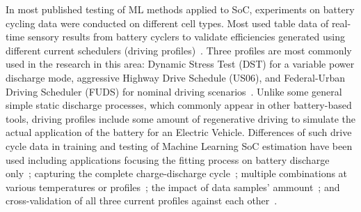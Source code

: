 %
In most published testing of ML methods applied to SoC, experiments on battery cycling data were conducted on different cell types.
Most used table data of real-time sensory results from battery cyclers to validate efficiencies generated using different current schedulers (driving profiles)~\cite{Chemali2017,song_lithium-ion_2018,mamo_long_2020,xiao_accurate_2019}.
Three profiles are most commonly used in the research in this area: Dynamic Stress Test (DST) for a variable power discharge mode, aggressive Highway Drive Schedule (US06), and Federal-Urban Driving Scheduler (FUDS) for nominal driving scenarios~\cite{xiao_accurate_2019,javid_adaptive_2020,mamo_long_2020}.
Unlike some general simple static discharge processes, which commonly appear in other battery-based tools, driving profiles include some amount of regenerative driving to simulate the actual application of the battery for an Electric Vehicle.
Differences of such drive cycle data in training and testing of Machine Learning SoC estimation have been used including applications focusing the fitting process on battery discharge only~\cite{song_lithium-ion_2018,mamo_long_2020,jiao_gru-rnn_2020,javid_adaptive_2020}; capturing the complete charge-discharge cycle~\cite{Chemali2017}; multiple combinations at various temperatures or profiles~\cite{xiao_accurate_2019,mamo_long_2020,Chemali2017,javid_adaptive_2020}; the impact of data samples' ammount~\cite{song_lithium-ion_2018}; and cross-validation of all three current profiles against each other~\cite{mamo_long_2020}.
%
